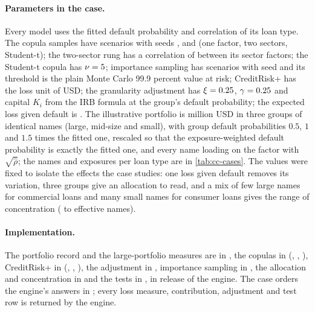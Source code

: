 \paragraph{Parameters in the case.} Every model uses the fitted default probability and correlation of its loan type. The copula samples
have \ccScen{} scenarios with seeds \ccSeedOne{}, \ccSeedMf{} and \ccSeedStu{} (one factor, two sectors, Student-t); the two-sector rung has
a correlation of \ccSectorCorr{} between its sector factors; the Student-t copula has $\nu=5$; importance sampling has \ccScenIs{}
scenarios with seed \ccSeedIs{} and its threshold is the plain Monte Carlo 99.9 percent value at risk; CreditRisk+ has the loss unit of
\ccLossUnit{} USD; the granularity adjustment has $\xi=0.25$, $\gamma=0.25$ and capital $K_i$ from the IRB formula at the group's default
probability; the expected loss given default is \ccLgd{}. The illustrative portfolio is \ccTotalEad{} million USD in three groups of identical
names (large, mid-size and small), with group default probabilities $0.5$, $1$ and $1.5$ times the fitted one, rescaled so that the
exposure-weighted default probability is exactly the fitted one, and every name loading on the factor with $\sqrt{\hat\rho}$; the names and
exposures per loan type are in \cref{tab:cc-cases}. The values were fixed to isolate the effects the case studies: one loss given default
removes its variation, three groups give an allocation to read, and a mix of few large names for commercial loans and many small names for
consumer loans gives the range of concentration (\ccEffNamesCre{} to \ccEffNamesCard{} effective names).

\paragraph{Implementation.} The portfolio record and the large-portfolio measures are in , the
copulas in  (, , ),
CreditRisk+ in  (, , ),
the adjustment in , importance sampling in , the
allocation and concentration in  and the tests in , in release
\ccEngine{} of the engine. The case orders the engine's answers in ; every loss measure,
contribution, adjustment and test row is returned by the engine.

